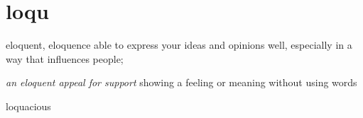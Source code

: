 \chapter{loqu}

\begin{word}{eloquent, eloquence}
    able to express your ideas and opinions well, especially in a way that influences people;

\textit{an eloquent appeal for support}
showing a feeling or meaning without using words
\end{word}

\begin{word}{loquacious}
\end{word}